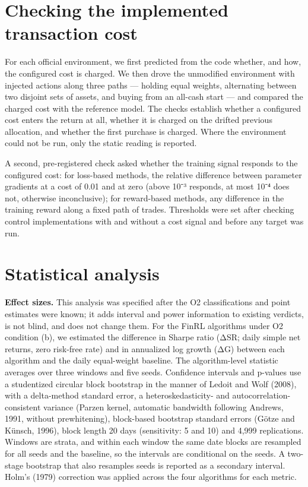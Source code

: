 \documentclass[12pt,a4paper]{report}
\begin{document}
\section{Checking the implemented transaction
cost}\label{checking-the-implemented-transaction-cost}

For each official environment, we first predicted from the code whether,
and how, the configured cost is charged. We then drove the unmodified
environment with injected actions along three paths --- holding equal
weights, alternating between two disjoint sets of assets, and buying
from an all-cash start --- and compared the charged cost with the
reference model. The checks establish whether a configured cost enters
the return at all, whether it is charged on the drifted previous
allocation, and whether the first purchase is charged. Where the
environment could not be run, only the static reading is reported.

A second, pre-registered check asked whether the training signal
responds to the configured cost: for loss-based methods, the relative
difference between parameter gradients at a cost of 0.01 and at zero
(above 10⁻³ responds, at most 10⁻⁴ does not, otherwise inconclusive);
for reward-based methods, any difference in the training reward along a
fixed path of trades. Thresholds were set after checking control
implementations with and without a cost signal and before any target was
run.

\section{Statistical analysis}\label{statistical-analysis}

\textbf{Effect sizes.} This analysis was specified after the O2
classifications and point estimates were known; it adds interval and
power information to existing verdicts, is not blind, and does not
change them. For the FinRL algorithms under O2 condition (b), we
estimated the difference in Sharpe ratio (ΔSR; daily simple net returns,
zero risk-free rate) and in annualized log growth (ΔG) between each
algorithm and the daily equal-weight baseline. The algorithm-level
statistic averages over three windows and five seeds. Confidence
intervals and p-values use a studentized circular block bootstrap in the
manner of Ledoit and Wolf (2008), with a delta-method standard error, a
heteroskedasticity- and autocorrelation-consistent variance (Parzen
kernel, automatic bandwidth following Andrews, 1991, without
prewhitening), block-based bootstrap standard errors (Götze and Künsch,
1996), block length 20 days (sensitivity: 5 and 10) and 4,999
replications. Windows are strata, and within each window the same date
blocks are resampled for all seeds and the baseline, so the intervals
are conditional on the seeds. A two-stage bootstrap that also resamples
seeds is reported as a secondary interval. Holm's (1979) correction was
applied across the four algorithms for each metric.
\end{document}
